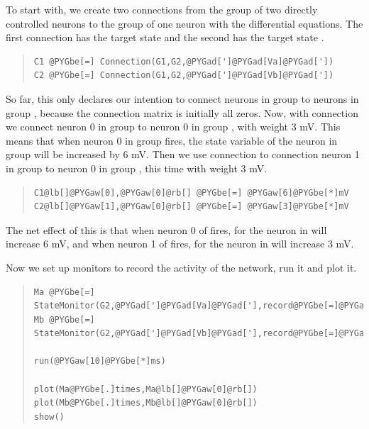 \documentclass[letterpaper,10pt]{manual}
\begin{document}
To start with, we create two connections from the group of two
directly controlled neurons to the group of one neuron with the
differential equations. The first connection has the target state 
and the second has the target state .
\begin{quote}

\begin{Verbatim}[commandchars=@\[\]]
C1 @PYGbe[=] Connection(G1,G2,@PYGad[']@PYGad[Va]@PYGad['])
C2 @PYGbe[=] Connection(G1,G2,@PYGad[']@PYGad[Vb]@PYGad['])
\end{Verbatim}
\end{quote}

So far, this only declares our intention to connect neurons in group
 to neurons in group , because the connection matrix is initially
all zeros. Now, with connection  we connect neuron 0 in group 
to neuron 0 in group , with weight 3 mV. This means that when neuron
0 in group  fires, the state variable  of the neuron in group 
will be increased by 6 mV. Then we use connection  to connection
neuron 1 in group  to neuron 0 in group , this time with weight
3 mV.
\begin{quote}

\begin{Verbatim}[commandchars=@\[\]]
C1@lb[]@PYGaw[0],@PYGaw[0]@rb[] @PYGbe[=] @PYGaw[6]@PYGbe[*]mV
C2@lb[]@PYGaw[1],@PYGaw[0]@rb[] @PYGbe[=] @PYGaw[3]@PYGbe[*]mV
\end{Verbatim}
\end{quote}

The net effect of this is that when neuron 0 of  fires,  for
the neuron in  will increase 6 mV, and when neuron 1 of  fires,
 for the neuron in  will increase 3 mV.

Now we set up monitors to record the activity of the network,
run it and plot it.
\begin{quote}

\begin{Verbatim}[commandchars=@\[\]]
Ma @PYGbe[=] StateMonitor(G2,@PYGad[']@PYGad[Va]@PYGad['],record@PYGbe[=]@PYGaA[True])
Mb @PYGbe[=] StateMonitor(G2,@PYGad[']@PYGad[Vb]@PYGad['],record@PYGbe[=]@PYGaA[True])

run(@PYGaw[10]@PYGbe[*]ms)

plot(Ma@PYGbe[.]times,Ma@lb[]@PYGaw[0]@rb[])
plot(Mb@PYGbe[.]times,Mb@lb[]@PYGaw[0]@rb[])
show()
\end{Verbatim}
\end{quote}
\end{document}
